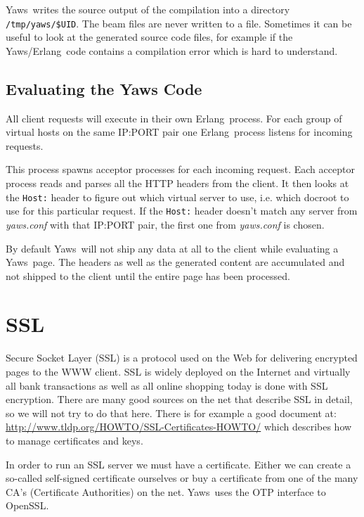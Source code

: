\documentclass[11pt,oneside,english]{book}
\newcommand{\Erlang}            %
        {{\sc Erlang}}
\newcommand{\Yaws}            %
        {{\sc Yaws}}
\begin{document}
\Yaws\ writes the source output of the compilation into a directory
\verb+/tmp/yaws/$UID+. The beam files are never written to a file.
Sometimes it can be useful to look at the generated source code files,
for example if the \Yaws{}\slash \Erlang\ code contains a compilation
error which is hard to understand.


\section{Evaluating the Yaws Code}

All client requests will execute in their own \Erlang\  process.
For each group of virtual hosts on the same IP:PORT pair
one \Erlang\  process listens for incoming requests.

This process spawns acceptor processes for each incoming request.
Each acceptor process reads and parses all the HTTP headers from the
client. It then looks at the \verb+Host:+ header to figure out which
virtual server to use, i.e. which docroot to use for this particular
request. If the \verb+Host:+ header doesn't match any server from
\textit{yaws.conf} with that IP:PORT pair, the first one from
\textit{yaws.conf} is chosen.

By default \Yaws\  will not ship any data at all to the client
while evaluating a \Yaws\  page. The headers as well as the generated
content are accumulated and not shipped to the client until the
entire page has been processed.


\chapter{SSL}

Secure Socket Layer (SSL) is a protocol used on the Web for delivering
encrypted pages to the WWW client. SSL is widely deployed on the
Internet and virtually all bank transactions as well as all online
shopping today is done with SSL encryption. There are many good
sources on the net that describe SSL in detail, so we will not try to
do that here.  There is for example a good document at:
\url{http://www.tldp.org/HOWTO/SSL-Certificates-HOWTO/} which
describes how to manage certificates and keys.

In order to run an SSL server we must have a certificate. Either we
can create a so-called self-signed certificate ourselves or buy a
certificate from one of the many CA's (Certificate Authorities) on the
net. \Yaws\  uses the OTP interface to OpenSSL.
\end{document}
